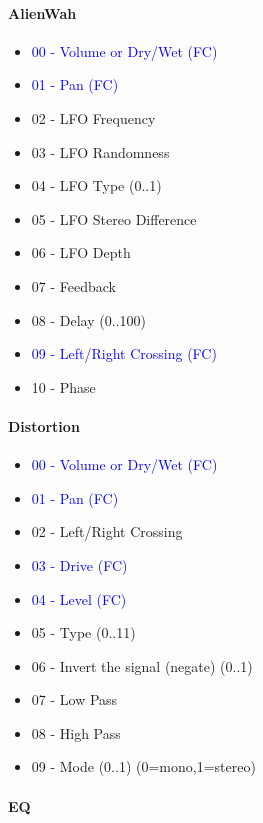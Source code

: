 \paragraph{AlienWah}

   \begin{itemize}
      \item \textcolor{blue}{00 - Volume or Dry/Wet (FC)}
      \item \textcolor{blue}{01 - Pan (FC)}
      \item 02 - LFO Frequency
      \item 03 - LFO Randomness
      \item 04 - LFO Type (0..1)
      \item 05 - LFO Stereo Difference
      \item 06 - LFO Depth
      \item 07 - Feedback
      \item 08 - Delay (0..100)
      \item \textcolor{blue}{09 - Left/Right Crossing (FC)}
      \item 10 - Phase
   \end{itemize}

\paragraph{Distortion}

   \begin{itemize}
      \item \textcolor{blue}{00 - Volume or Dry/Wet (FC)}
      \item \textcolor{blue}{01 - Pan (FC)}
      \item 02 - Left/Right Crossing
      \item \textcolor{blue}{03 - Drive (FC)}
      \item \textcolor{blue}{04 - Level (FC)}
      \item 05 - Type (0..11)
      \item 06 - Invert the signal (negate) (0..1)
      \item 07 - Low Pass
      \item 08 - High Pass
      \item 09 - Mode (0..1) (0=mono,1=stereo)
   \end{itemize}

\paragraph{EQ}


